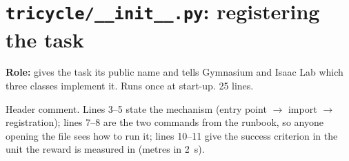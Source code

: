 \chapter{\texttt{tricycle/\_\_init\_\_.py}: registering the task}
\label{ch:task_init}

\textbf{Role:} gives the task its public name and tells Gymnasium and Isaac
Lab which three classes implement it. Runs once at start-up. 25 lines.


\begin{explain}
 Header comment. Lines 3--5 state the mechanism (entry point
  $\to$ import $\to$ registration); lines 7--8 are the two commands from the
  runbook, so anyone opening the file sees how to run it; lines 10--11 give
  the success criterion in the unit the reward is measured in (metres in
  2~s).
\end{explain}


